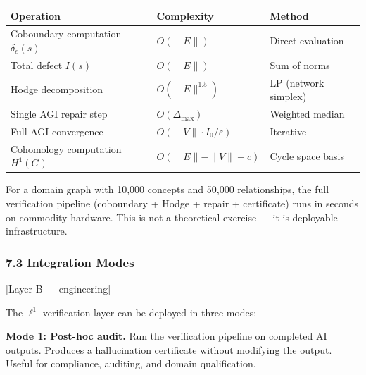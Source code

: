 \documentclass[
]{article}
\begin{document}
\begin{longtable}[]{@{}
  >{\raggedright\arraybackslash}p{}
  >{\raggedright\arraybackslash}p{}
  >{\raggedright\arraybackslash}p{}@{}}
\toprule\noalign{}
\begin{minipage}[b]{\linewidth}\raggedright
Operation
\end{minipage} & \begin{minipage}[b]{\linewidth}\raggedright
Complexity
\end{minipage} & \begin{minipage}[b]{\linewidth}\raggedright
Method
\end{minipage} \\
\midrule\noalign{}
\endhead
\bottomrule\noalign{}
\endlastfoot
Coboundary computation \(\delta_e(s)\) & \(O(\|E\|)\) & Direct
evaluation \\
Total defect \(I(s)\) & \(O(\|E\|)\) & Sum of norms \\
Hodge decomposition & \(O(\|E\|^{1.5})\) & LP (network simplex) \\
Single AGI repair step & \(O(\Delta_{\max})\) & Weighted median \\
Full AGI convergence & \(O(\|V\| \cdot I_0 / \varepsilon)\) &
Iterative \\
Cohomology computation \(H^1(G)\) & \(O(\|E\| - \|V\| + c)\) & Cycle
space basis \\
\end{longtable}

For a domain graph with 10,000 concepts and 50,000 relationships, the
full verification pipeline (coboundary + Hodge + repair + certificate)
runs in seconds on commodity hardware. This is not a theoretical
exercise --- it is deployable infrastructure.

\subsubsection{7.3 Integration Modes}\label{integration-modes}

{[}Layer B --- engineering{]}

The \(\ell^1\) verification layer can be deployed in three modes:

\textbf{Mode 1: Post-hoc audit.} Run the verification pipeline on
completed AI outputs. Produces a hallucination certificate without
modifying the output. Useful for compliance, auditing, and domain
qualification.
\end{document}
